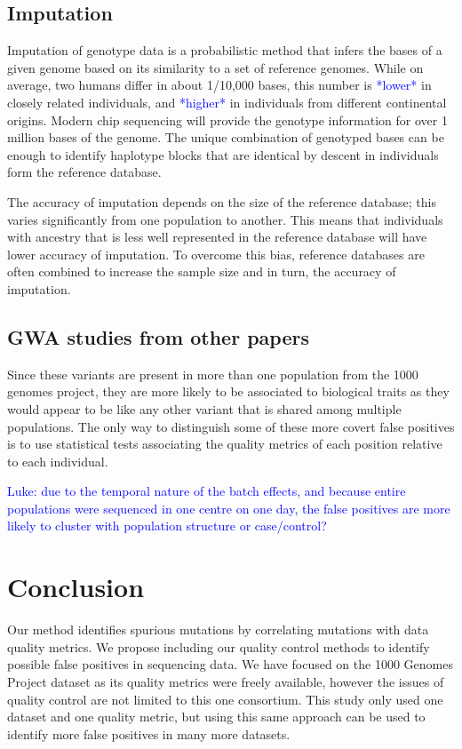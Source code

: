 \documentclass[9pt,lineno]{elife}
\newcommand{\luke}[1]{\textcolor{blue}{Luke: #1}}
\newcommand{\todo}[1]{\textcolor{blue}{*#1*}}
\begin{document}
\subsection{Imputation}
Imputation of genotype data is a probabilistic method that infers the bases of a given genome based on its similarity to a set of reference genomes.
While on average, two humans differ in about 1/10,000 bases, this number is \todo{lower} in closely related individuals, and \todo{higher} in individuals from different continental origins.
Modern chip sequencing will provide the genotype information for over 1 million bases of the genome.
The unique combination of genotyped bases can be enough to identify haplotype blocks that are identical by descent in individuals form the reference database.


The accuracy of imputation depends on the size of the reference database; this varies significantly from one population to another.
This means that individuals with ancestry that is less well represented in the reference database will have lower accuracy of imputation.
To overcome this bias, reference databases are often combined to increase the sample size and in turn, the accuracy of imputation.

\subsection{GWA studies from other papers}
Since these variants are present in more than one population from the 1000 genomes project, they are more likely to be associated to biological traits as they would appear to be like any other variant that is shared among multiple populations. 
The only way to distinguish some of these more covert false positives is to use statistical tests associating the quality metrics of each position relative to each individual. 

\luke{due to the temporal nature of the batch effects, and because entire populations were sequenced in one centre on one day, the false positives are more likely to cluster with population structure or case/control?}

			\section{Conclusion}
Our method identifies spurious mutations by correlating mutations with data quality metrics. 
We propose including our quality control methods to identify possible false positives in sequencing data. 
We have focused on the 1000 Genomes Project dataset as its quality metrics were freely available, however the issues of quality control are not limited to this one consortium. 
This study only used one dataset and one quality metric, but using this same approach can be used to identify more false positives in many more datasets. 
\end{document}
